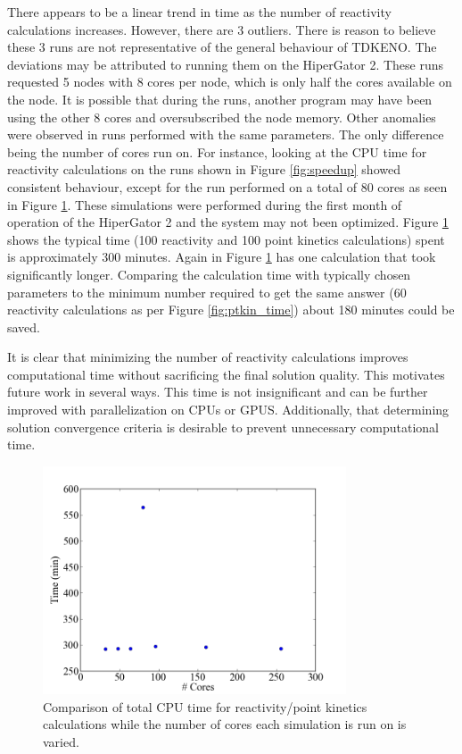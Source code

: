 \documentclass{anstrans}
\begin{document}
There appears to be a linear trend in time as the number of reactivity calculations increases.  However, there are 3 outliers.  There is reason to believe these 3 runs are not representative of the general behaviour of TDKENO. The deviations may be attributed to running them on the HiperGator 2. These runs requested 5 nodes with 8 cores per node, which is only half the cores available on the node.  It is possible that during the runs, another program may have been using the other 8 cores and oversubscribed the node memory.  Other anomalies were observed in runs performed with the same parameters. The only difference being the number of cores run on.  For instance, looking at the CPU time for reactivity calculations on the runs shown in Figure \ref{fig:speedup} showed consistent behaviour, except for the run performed on a total of 80 cores as seen in Figure \ref{fig:ptkin_same_time}. These simulations were performed during the first month of operation of the HiperGator 2 and the system may not been optimized.  Figure \ref{fig:ptkin_same_time} shows the typical time (100 reactivity and 100 point kinetics calculations) spent  is approximately 300 minutes. Again in Figure \ref{fig:ptkin_same_time} has one calculation that took significantly longer.  Comparing the calculation time with typically chosen parameters to the minimum number required to get the same answer (60 reactivity calculations as per Figure \ref{fig:ptkin_time}) about 180 minutes could be saved.  

It is clear that minimizing the number of reactivity calculations improves computational time without sacrificing the final solution quality.  This motivates future work in several ways.  This time is not insignificant and can be further improved with parallelization on CPUs or GPUS.  Additionally, that determining solution convergence criteria is desirable to prevent unnecessary computational time.   

\begin{figure}[h]
    \centering
    \includegraphics[width=9cm]{figures/comp_time_same-ptkin.png}
    \caption{Comparison of total CPU time for reactivity/point kinetics calculations while the number of cores each simulation is run on is varied.}
    \label{fig:ptkin_same_time}
\end{figure}
\end{document}
